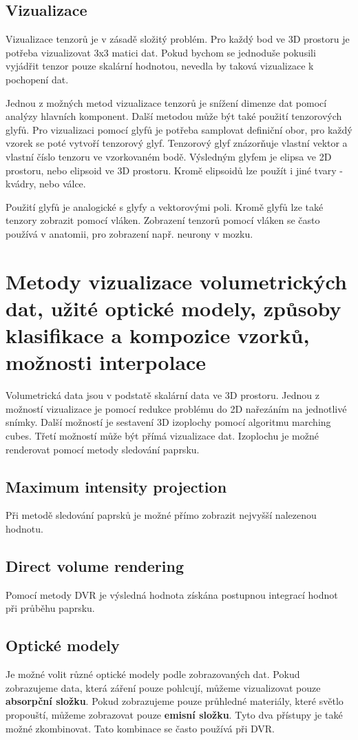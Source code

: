 \documentclass[10pt,a4paper, table]{article}
\begin{document}
\subsection{Vizualizace}
Vizualizace tenzorů je v zásadě složitý problém. Pro každý bod ve 3D prostoru je potřeba vizualizovat 3x3 matici dat. Pokud bychom se jednoduše pokusili vyjádřit tenzor pouze skalární hodnotou, nevedla by taková vizualizace k pochopení dat. \par
Jednou z možných metod vizualizace tenzorů je snížení dimenze dat pomocí analýzy hlavních komponent. Další metodou může být také použití tenzorových glyfů. Pro vizualizaci pomocí glyfů je potřeba samplovat definiční obor, pro každý vzorek se poté vytvoří tenzorový glyf. Tenzorový glyf znázorňuje vlastní vektor a vlastní číslo tenzoru ve vzorkovaném bodě. Výsledným glyfem je elipsa ve 2D prostoru, nebo elipsoid ve 3D prostoru. Kromě elipsoidů lze použít i jiné tvary - kvádry, nebo válce. \par
Použití glyfů je analogické s glyfy a vektorovými poli. Kromě glyfů lze také tenzory zobrazit pomocí vláken. Zobrazení tenzorů pomocí vláken se často používá v anatomii, pro zobrazení např. neurony v mozku.


\clearpage
\section{Metody  vizualizace volumetrických dat, užité optické modely, způsoby klasifikace  a kompozice vzorků, možnosti interpolace}
Volumetrická data jsou v podstatě skalární data ve 3D prostoru. Jednou z možností vizualizace je pomocí redukce problému do 2D nařezáním na jednotlivé snímky. Další možností je sestavení 3D izoplochy pomocí algoritmu marching cubes. Třetí možností může být přímá vizualizace dat. Izoplochu je možné renderovat pomocí metody sledování paprsku.
\subsection{Maximum intensity projection}
Při metodě sledování paprsků je možné přímo zobrazit nejvyšší nalezenou hodnotu.
\subsection{Direct volume rendering}
Pomocí metody DVR je výsledná hodnota získána postupnou integrací hodnot při průběhu paprsku.
\subsection{Optické modely}
Je možné volit různé optické modely podle zobrazovaných dat. Pokud zobrazujeme data, která záření pouze pohlcují, můžeme vizualizovat pouze \textbf{absorpční složku}. Pokud zobrazujeme pouze průhledné materiály, které světlo propouští, můžeme zobrazovat pouze \textbf{emisní složku}.  Tyto dva přístupy je také možné zkombinovat. Tato kombinace se často používá při DVR.
\end{document}
